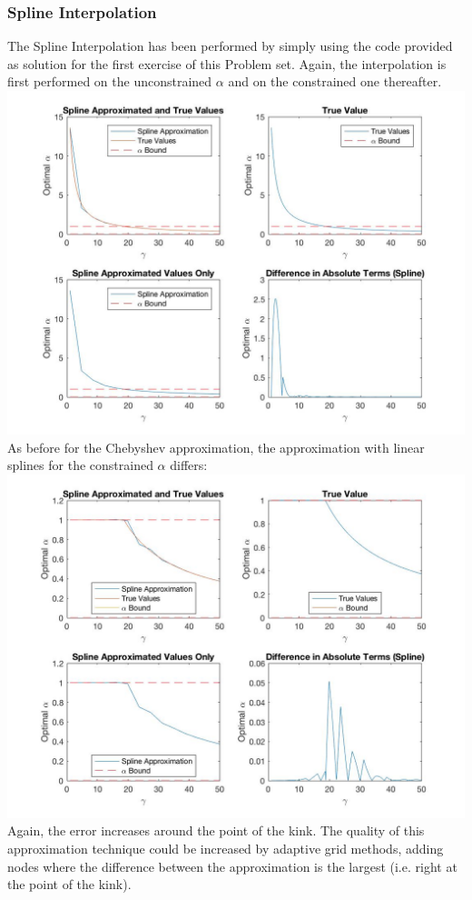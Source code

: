 \documentclass{article}
\begin{document}
\subsubsection{Spline Interpolation}
The Spline Interpolation has been performed by simply using the code provided as solution for the first exercise of this Problem set. Again, the interpolation is first performed on the unconstrained $\alpha$ and on the constrained one thereafter. \\
\includegraphics[width = \textwidth, keepaspectratio]{PS4Q3SPLINE.jpg} 
As before for the Chebyshev approximation, the approximation with linear splines for the constrained $\alpha$ differs:\\
\includegraphics[width = \textwidth, keepaspectratio]{PS4Q3SPLINE_constrained.jpg}
Again, the error increases around the point of the kink. The quality of this approximation technique could be increased by adaptive grid methods, adding nodes where the difference between the approximation is the largest (i.e. right at the point of the kink).
\end{document}
